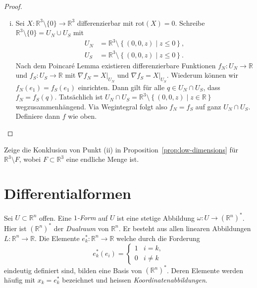 \documentclass[../main.tex]{subfiles}
\begin{document}
\begin{proof}
\begin{enumerate}[(i)]
    \item Sei
      $X \colon \mathbb{R}^3 \setminus \{0\}
      \to \mathbb{R}^3$
      differenzierbar mit $\text{rot}(X) = 0$.
      Schreibe
      $\mathbb{R}^3 \setminus \{0\}
      = U_N \cup U_S$
      mit
      \begin{align*}
        U_N & = \mathbb{R}^3 \setminus
        \left\{(0, 0, z) \mid z \leq 0\right\},\\
        U_S & = \mathbb{R}^3 \setminus
        \left\{(0, 0, z) \mid z \leq 0\right\}.
      \end{align*}
      Nach dem Poincaré Lemma existieren differenzierbare Funktionen
      $f_N \colon U_N \to \mathbb{R}$
      und $f_S \colon U_S \to \mathbb{R}$ mit
      $\nabla f_N = X|_{U_N}$ und $\nabla f_S = X|_{U_S}$.
      Wiederum können wir
      $f_N(e_1) = f_S(e_1)$ einrichten.
      Dann gilt für alle
      $q \in U_N \cap U_S$, dass
      $f_N = f_S(q)$.
      Tatsächlich ist $U_N \cap U_S = \mathbb{R}^3
      \setminus \left\{(0, 0, z) \mid z \in \mathbb{R}\right\}$
      wegzusammenhängend.
      Via Wegintegral folgt also $f_N = f_S$ auf ganz $U_N \cap U_S$.
      Definiere dann $f$ wie oben. \qedhere
  \end{enumerate}
\end{proof}

\begin{exercise}
  Zeige die Konklusion von Punkt (ii) in Proposition~\ref{prop:low-dimensions}
  für $\mathbb{R}^3 \setminus F$, wobei $F \subset \mathbb{R}^3$
  eine endliche Menge ist.
\end{exercise}

\section{Differentialformen}
Sei $U \subset \mathbb{R}^n$ offen.
Eine \emph{$1$-Form} auf $U$ ist eine stetige Abbildung
$\omega \colon U \to {(\mathbb{R}^n)}^*$.
Hier ist ${(\mathbb{R}^n)}^*$ der \emph{Dualraum} von $\mathbb{R}^n$.
Er besteht aus allen linearen Abbildungen
$L \colon \mathbb{R}^n \to \mathbb{R}$.
Die Elemente $e_k^* \colon \mathbb{R}^n \to \mathbb{R}$
welche durch die Forderung
\[
  e_k^*(e_i) =
  \begin{cases}
    1 & i = k, \\
    0 & i \neq k
  \end{cases}
\]
eindeutig definiert sind, bilden eine Basis von
${(\mathbb{R}^n)}^*$.
Deren Elemente werden häufig mit $x_k = e_k^*$
bezeichnet und heissen \emph{Koordinatenabbildungen}.
\end{document}
